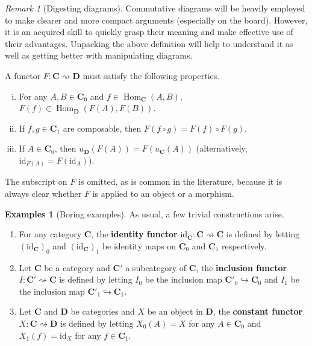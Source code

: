 \documentclass{article}
\theoremstyle{definition}
\newtheorem{exmps}[thm]{Examples}
\theoremstyle{remark}
\newtheorem{rem}[thm]{Remark}
\DeclareMathOperator{\Hom}{Hom}
\newcommand{\id}{\text{id}}
\begin{document}
\begin{rem}[Digesting diagrams]
	Commutative diagrams will be heavily employed to make clearer and more compact arguments (especially on the board). However, it is an acquired skill to quickly grasp their meaning and make effective use of their advantages. Unpacking the above definition will help to understand it as well as getting better with manipulating diagrams.
	
	A functor $F:\mathbf{C}\rightsquigarrow \mathbf{D}$ must satisfy the following properties.
	\begin{enumerate}[i.]
		\item For any $A, B \in \mathbf{C}_0$ and $f \in \Hom_{\mathbf{C}}(A,B)$, $F(f) \in \Hom_{\mathbf{D}}(F(A), F(B))$.
		\item If $f,g \in \mathbf{C}_1$ are composable, then $F(f\circ g) = F(f) \circ F(g)$.
		\item If $A \in \mathbf{C}_0$, then $u_{\mathbf{D}}(F(A)) = F(u_{\mathbf{C}}(A))$ (alternatively, $\id_{F(A)} = F(\id_A)$).
	\end{enumerate}
	The subscript on $F$ is omitted, as is common in the literature, because it is always clear whether $F$ is applied to an object or a morphism.
\end{rem}
\begin{exmps}[Boring examples]
	As usual, a few trivial constructions arise.
	\begin{enumerate}
		\item For any category $\mathbf{C}$, the \textbf{identity functor} $\id_{\mathbf{C}}: \mathbf{C}\rightsquigarrow \mathbf{C}$ is defined by letting $(\id_{\mathbf{C}})_0$ and $(\id_{\mathbf{C}})_1$ be identity maps on $\mathbf{C}_0$ and $\mathbf{C}_1$ respectively.
		\item Let $\mathbf{C}$ be a category and $\mathbf{C}'$ a subcategory of $\mathbf{C}$, the \textbf{inclusion functor} $I: \mathbf{C}' \rightsquigarrow \mathbf{C}$ is defined by letting $I_0$ be the inclusion map $\mathbf{C}'_0 \hookrightarrow \mathbf{C}_0$ and $I_1$ be the inclusion map $\mathbf{C}'_1 \hookrightarrow \mathbf{C}_1$.
		\item Let $\mathbf{C}$ and $\mathbf{D}$ be categories and $X$ be an object in $\mathbf{D}$, the \textbf{constant functor} $X: \mathbf{C} \rightsquigarrow \mathbf{D}$ is defined by letting $X_0(A) = X$ for any $A \in \mathbf{C}_0$ and $X_1(f) = \id_X$ for any $f \in \mathbf{C}_1$.
	\end{enumerate}
\end{exmps}
\end{document}
